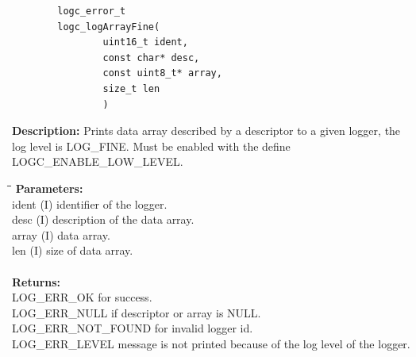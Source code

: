 \documentclass[a4paper, titlepage, 11pt]{article}
\begin{document}
\newpage

\small
\begin{verbatim}
        logc_error_t
        logc_logArrayFine(
                uint16_t ident,
                const char* desc,
                const uint8_t* array,
                size_t len
                )
\end{verbatim}
\normalsize
\textbf{Description:} Prints data array described by a descriptor to a given logger, the log level is LOG\_FINE. Must be enabled with the define LOGC\_ENABLE\_LOW\_LEVEL.
\begin{tabbing}
\hspace*{1cm}\=\hspace*{2cm}\=\hspace*{0,6cm}\= \kill
\textbf{Parameters:} \\
\> ident \> (I) identifier of the logger. \\
\> desc \> (I) description of the data array. \\
\> array \> (I) data array. \\
\> len \> (I) size of data array. \\ \\
\textbf{Returns:} \\
\> LOG\_ERR\_OK for success. \\
\> LOG\_ERR\_NULL if descriptor or array is NULL. \\
\> LOG\_ERR\_NOT\_FOUND for invalid logger id. \\
\> LOG\_ERR\_LEVEL message is not printed because of the log level of the logger. \\ \\ \\
\end{tabbing}
\end{document}
